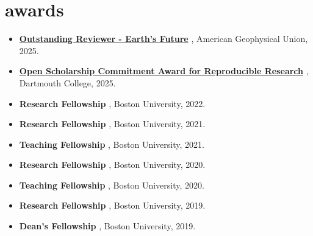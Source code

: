 \documentclass[10pt,oneside]{article}
\begin{document}

\section{awards}

\mbox{}\vspace{-\dimexpr\baselineskip\relax}

\begin{itemize}[label={}]
  
  \item
    
      \href{https://www.agu.org/user-profile?cstkey=2aed905f-b819-4e8e-a70a-338d3932a001}{\textbf{Outstanding Reviewer - Earth's Future}}
    ,
    American Geophysical Union, 2025.
  
  \item
    
      \href{https://researchguides.dartmouth.edu/c.php?g=1435408&p=10819576#s-lg-box-35687611}{\textbf{Open Scholarship Commitment Award for Reproducible Research}}
    ,
    Dartmouth College, 2025.
  
  \item
    
      \textbf{Research Fellowship}
    ,
    Boston University, 2022.
  
  \item
    
      \textbf{Research Fellowship}
    ,
    Boston University, 2021.
  
  \item
    
      \textbf{Teaching Fellowship}
    ,
    Boston University, 2021.
  
  \item
    
      \textbf{Research Fellowship}
    ,
    Boston University, 2020.
  
  \item
    
      \textbf{Teaching Fellowship}
    ,
    Boston University, 2020.
  
  \item
    
      \textbf{Research Fellowship}
    ,
    Boston University, 2019.
  
  \item
    
      \textbf{Dean's Fellowship}
    ,
    Boston University, 2019.
  
\end{itemize}
\end{document}
